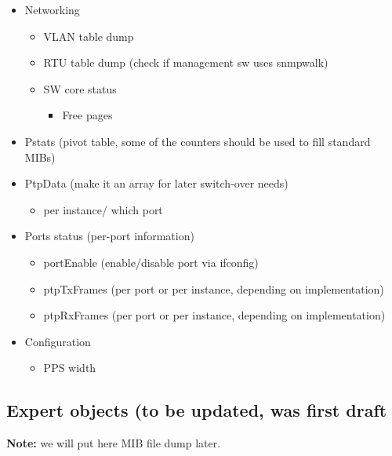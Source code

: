 \begin{itemize}
  \item Networking
  \begin{itemize}
    \item VLAN table dump
    \item RTU table dump (check if management sw uses snmpwalk)
    \item SW core status
    \begin{itemize}
      \item Free pages
    \end{itemize}
  \end{itemize}

  \item Pstats (pivot table, some of the counters should be used to fill
    standard MIBs)
  \item PtpData (make it an array for later switch-over needs)
  \begin{itemize}
     \item per instance/ which port
   \end{itemize}

  \item Ports status (per-port information)
  \begin{itemize}
    \item portEnable (enable/disable port via ifconfig)
    \item ptpTxFrames (per port or per instance, depending on implementation)
    \item ptpRxFrames (per port or per instance, depending on implementation)
  \end{itemize}

  \item Configuration
  \begin{itemize}
    \item PPS width
  \end{itemize}

\end{itemize}

\newpage
\subsection{Expert objects (to be updated, was first draft}
{\bf Note:} we will put here MIB file dump later.

